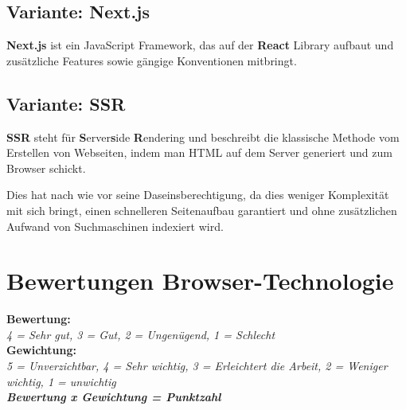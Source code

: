 \subsection{Variante: Next.js}

\textbf{Next.js} ist ein JavaScript Framework, das auf der \textbf{React}
Library aufbaut und zusätzliche Features sowie gängige Konventionen mitbringt.

\subsection{Variante: SSR}

\textbf{SSR} steht für \textbf{S}erver\textbf{s}ide \textbf{R}endering und
beschreibt die klassische Methode vom Erstellen von Webseiten, indem man HTML
auf dem Server generiert und zum Browser schickt.

Dies hat nach wie vor seine Daseinsberechtigung, da dies weniger Komplexität
mit sich bringt, einen schnelleren Seitenaufbau garantiert und ohne
zusätzlichen Aufwand von Suchmaschinen indexiert wird.

\clearpage
\section{Bewertungen Browser-Technologie}\label{bewertungen-browser-technologie}

\textbf{Bewertung:}\\
\textit{4 = Sehr gut, 3 = Gut, 2 = Ungenügend, 1 = Schlecht}\\
\textbf{Gewichtung:}\\
\textit{5 = Unverzichtbar, 4 = Sehr wichtig, 3 = Erleichtert die Arbeit, 2 = Weniger wichtig, 1 = unwichtig}\\

\textbf{\textit{Bewertung x Gewichtung = Punktzahl}}

